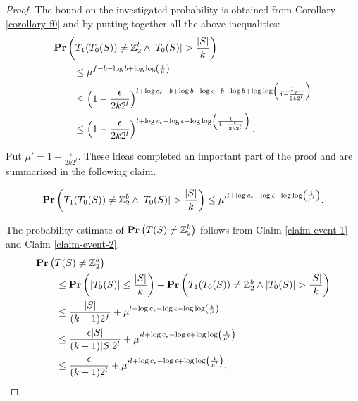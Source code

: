 \begin{proof}
The bound on the investigated probability is obtained from Corollary \ref{corollary-f0} and by putting together all the above inequalities:
\[
\begin{split}
& \mathbf{Pr}\left(T_1(T_0(S)) \neq \mathbb{Z}_{2}^{b} \wedge |T_0(S)| > \frac{|S|}{k}\right) \\
	& \qquad \leq \mu ^ {f - b - \log b + \log \log \left(\frac{1}{\mu}\right)} \\
	& \qquad \leq \left(1 - \frac{\epsilon}{2 k 2 ^ l}\right)^{l + \log c_\epsilon + b + \log b - \log \epsilon - b - \log b + \log \log \left(\frac{1}{1 - \frac{\epsilon}{2 k 2 ^ l}}\right)} \\
	& \qquad \leq \left(1 - \frac{\epsilon}{2 k 2 ^ l}\right)^{l + \log c_\epsilon - \log \epsilon + \log \log \left(\frac{1}{1 - \frac{\epsilon}{2 k 2 ^ l}}\right)} \text{.}
\end{split}
\]

Put $\mu' = 1 - \frac{\epsilon}{2k2 ^ l}$. These ideas completed an important part of the proof and are summarised in the following claim.
\begin{claim}
\label{claim-event-2}
\[
	\mathbf{Pr}\left(T_1(T_0(S)) \neq \mathbb{Z}_{2}^{b} \wedge |T_0(S)| > \frac{|S|}{k}\right) \leq {\mu'} ^ {l + \log c_\epsilon - \log \epsilon + \log \log \left(\frac{1}{\mu'}\right)} \text{.}
\]
\end{claim}

The probability estimate of $\mathbf{Pr}\left(T(S) \neq \mathbb{Z}_{2}^{b}\right)$ follows from Claim \ref{claim-event-1} and Claim \ref{claim-event-2}.
\[
\begin{split}
& \mathbf{Pr}\left(T(S) \neq \mathbb{Z}_{2}^{b}\right) \\
	& \qquad \leq \mathbf{Pr}\left(|T_0(S)| \leq \frac{|S|}{k}\right) + \mathbf{Pr}\left(T_1(T_0(S)) \neq \mathbb{Z}_{2}^{b} \wedge |T_0(S)| > \frac{|S|}{k}\right) \\ 
	& \qquad \leq \frac{|S|}{(k - 1)2 ^ f} + \mu ^ { l + \log c_{\epsilon} - \log \epsilon + \log \log \left(\frac{1}{\mu}\right)} \\
	& \qquad \leq \frac{\epsilon |S|}{(k - 1) |S| 2 ^ l} + {\mu'} ^ {l + \log c_\epsilon - \log \epsilon + \log \log \left(\frac{1}{\mu'}\right)} \\
	& \qquad \leq \frac{\epsilon}{(k - 1) 2 ^ l} + {\mu'} ^ {l + \log c_\epsilon - \log \epsilon + \log \log \left(\frac{1}{\mu'}\right)} \text{.}
\end{split}
\]


\end{proof}
